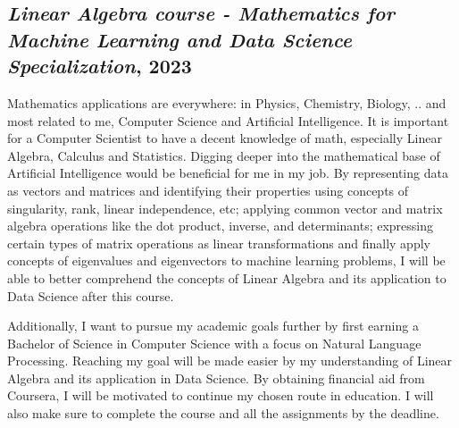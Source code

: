 \subsection{\textit{Linear Algebra course - Mathematics for Machine Learning and Data Science Specialization},  2023}
Mathematics applications are everywhere: in Physics, Chemistry, Biology, .. and most related to me, Computer Science and Artificial Intelligence. It is important for a Computer Scientist to have a decent knowledge of math, especially Linear Algebra, Calculus and Statistics. Digging deeper into the mathematical base of Artificial Intelligence would be beneficial for me in my job. By representing data as vectors and matrices and identifying their properties using concepts of singularity, rank, linear independence, etc; applying common vector and matrix algebra operations like the dot product, inverse, and determinants; expressing certain types of matrix operations as linear transformations and finally apply concepts of eigenvalues and eigenvectors to machine learning problems, I will be able to better comprehend the concepts of Linear Algebra and its application to Data Science after this course.

Additionally, I want to pursue my academic goals further by first earning a Bachelor of Science in Computer Science with a focus on Natural Language Processing. Reaching my goal will be made easier by my understanding of Linear Algebra and its application in Data Science. By obtaining financial aid from Coursera, I will be motivated to continue my chosen route in education. I will also make sure to complete the course and all the assignments by the deadline. 